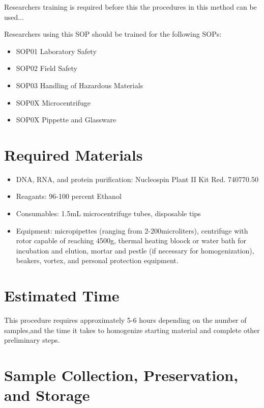 \documentclass[12pt]{../SOP3_alpha}
\begin{document}
\NP Researchers training is required before this the procedures in this method can be used... 

\NP Researchers using this SOP should be trained for the following SOPs:

\begin{itemize}
  \item SOP01 Laboratory Safety
  \item SOP02 Field Safety
  \item SOP03 Handling of Hazardous Materials
  \item SOP0X Microcentrifuge
  \item SOP0X Pippette and Glassware
\end{itemize}

\section{Required Materials}

\NP 
\begin{itemize}
  \item DNA, RNA, and protein purification: Nucleospin Plant II Kit Red. 740770.50
\end{itemize}



\begin{itemize}
  \item Reagants: 96-100 percent Ethanol 
  \item Consumables: 1.5mL microcentrifuge tubes, disposable tips
  \item Equipment: micropipettes (ranging from 2-200microliters), centrifuge with rotor capable of reaching 4500g, thermal heating bloock or water bath for incubation and elution, mortar and pestle (if necessary for homogenization), beakers, vortex, and personal protection equipment.
\end{itemize}

\section{Estimated Time}

\NP This procedure requires approximately 5-6 hours depending on the number of samples,and the time it takes to homogenize starting material and complete other preliminary steps. 

\section{Sample Collection, Preservation, and Storage}
\end{document}
